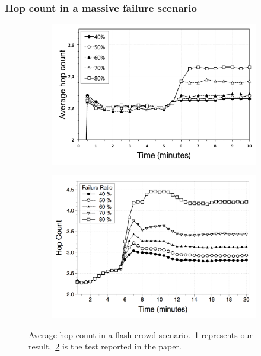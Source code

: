 \documentclass{beamer}
\begin{document}
\begin{frame}
\frametitle{Hop count in a massive failure scenario}

\begin{figure}
\centering
\begin{subfigure}{.5\textwidth}
  \centering
  \includegraphics[keepaspectratio=true, width=1\linewidth]{images/average_hop_count_failures_1impl}
  \caption{}
  \label{fig:average_hop_count_failures_1impl}
\end{subfigure}%
\begin{subfigure}{.5\textwidth}
  \centering
  \includegraphics[keepaspectratio=true, width=1\linewidth]{images/paper_average_hop_count_failures}
  \caption{}
  \label{fig:paper_average_hop_count_failures}
\end{subfigure}
\caption{Average hop count in a flash crowd scenario.~\ref{fig:average_hop_count_failures_1impl} represents our result,~\ref{fig:paper_average_hop_count_failures} is the test reported in the paper.}
\label{fig:robustness_hop_count_failures}
\end{figure}

\end{frame}
\end{document}
